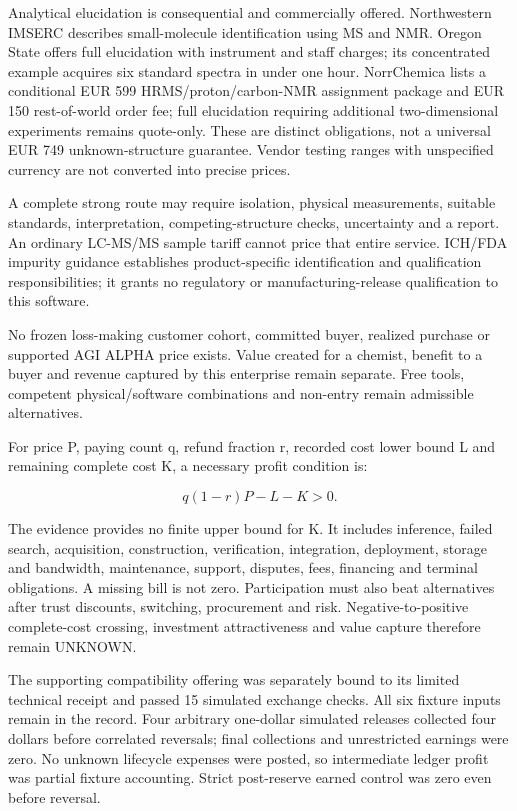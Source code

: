 \documentclass[
  10pt,
]{article}
\begin{document}
Analytical elucidation is consequential and commercially offered.
Northwestern IMSERC describes small-molecule identification using MS and
NMR. Oregon State offers full elucidation with instrument and staff
charges; its concentrated example acquires six standard spectra in under
one hour. NorrChemica lists a conditional EUR 599 HRMS/proton/carbon-NMR
assignment package and EUR 150 rest-of-world order fee; full elucidation
requiring additional two-dimensional experiments remains quote-only.
These are distinct obligations, not a universal EUR 749
unknown-structure guarantee. Vendor testing ranges with unspecified
currency are not converted into precise prices.

A complete strong route may require isolation, physical measurements,
suitable standards, interpretation, competing-structure checks,
uncertainty and a report. An ordinary LC-MS/MS sample tariff cannot
price that entire service. ICH/FDA impurity guidance establishes
product-specific identification and qualification responsibilities; it
grants no regulatory or manufacturing-release qualification to this
software.

No frozen loss-making customer cohort, committed buyer, realized
purchase or supported AGI ALPHA price exists. Value created for a
chemist, benefit to a buyer and revenue captured by this enterprise
remain separate. Free tools, competent physical/software combinations
and non-entry remain admissible alternatives.

For price P, paying count q, refund fraction r, recorded cost lower
bound L and remaining complete cost K, a necessary profit condition is:

\[
q(1-r)P - L - K > 0.
\]

The evidence provides no finite upper bound for K. It includes
inference, failed search, acquisition, construction, verification,
integration, deployment, storage and bandwidth, maintenance, support,
disputes, fees, financing and terminal obligations. A missing bill is
not zero. Participation must also beat alternatives after trust
discounts, switching, procurement and risk. Negative-to-positive
complete-cost crossing, investment attractiveness and value capture
therefore remain UNKNOWN.

The supporting compatibility offering was separately bound to its
limited technical receipt and passed 15 simulated exchange checks. All
six fixture inputs remain in the record. Four arbitrary one-dollar
simulated releases collected four dollars before correlated reversals;
final collections and unrestricted earnings were zero. No unknown
lifecycle expenses were posted, so intermediate ledger profit was
partial fixture accounting. Strict post-reserve earned control was zero
even before reversal.
\end{document}

